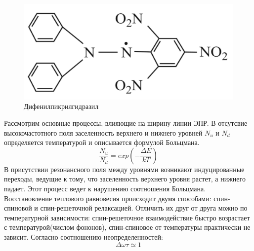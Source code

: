 \documentclass[a4paper,12pt]{article}
\theoremstyle{plain} %
\theoremstyle{definition} %
\theoremstyle{remark} %
\begin{document}
 \begin{figure}[h!]
\centering
\includegraphics[width=0.7\linewidth]{dfpg.PNG}
\caption{Дифенилпикрилгидразил}
\end{figure}

\begin{multicols}{2}
    Рассмотрим основные процессы, влияющие на ширину линии ЭПР. В отсутсвие высокочастотного поля заселенность верхнего и нижнего уровней $N_u$ и $N_d$ определяется температурой и описывается формулой Больцмана.
    \begin{equation}
        \frac{N_u}{N_d} = exp\left(-\frac{\Delta E}{kT}\right)
    \end{equation}
    В присутствии резонансного поля между уровнями возникают индуцированные переходы, ведущие к тому, что заселенность верхнего уровня растет, а нижнего падает. Этот процесс ведет к нарушению соотношения Больцмана. Восстановление теплового равновесия происходит двумя способами: спин-спиновой и спин-решеточной релаксацией.
    Отличить их друг от друга можно по температурной зависимости: спин-решеточное взаимодействие быстро возрастает с температурой(числом фононов), спин-спиновое от температуры практически не зависит.
    Согласно соотношению неопределенностей:
    \begin{equation}
        \Delta\omega\tau \simeq 1
    \end{equation}
\end{multicols}
	\newpage
\end{document}
